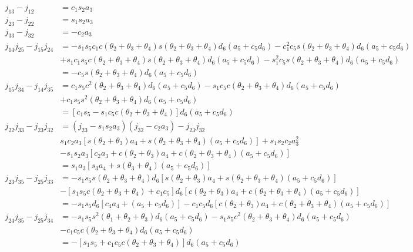 \begin{align*}
    j_{13} - j_{12} &= c_1s_2a_3 \\
    j_{23} - j_{22} &= s_1s_2a_3 \\
    j_{33} - j_{32} &= -c_2a_3 \\
    j_{14}j_{25} - j_{15}j_{24} &= -s_1s_5c_1c(\theta_2+\theta_3+\theta_4)s(\theta_2+\theta_3+\theta_4)d_6(a_5+c_5d_6) - c_1^2c_5s(\theta_2+\theta_3+\theta_4)d_6(a_5+c_5d_6) \\
                                &  +s_1c_1s_5c(\theta_2+\theta_3+\theta_4)s(\theta_2+\theta_3+\theta_4)d_6(a_5+c_5d_6) - s_1^2c_5s(\theta_2+\theta_3+\theta_4)d_6(a_5+c_5d_6) \\
                                &= -c_5s(\theta_2+\theta_3+\theta_4)d_6(a_5+c_5d_6)\\
    j_{15}j_{34} - j_{14}j_{35} &= c_1s_5c^2(\theta_2+\theta_3+\theta_4)d_6(a_5+c_5d_6) -s_1c_5c(\theta_2+\theta_3+\theta_4)d_6(a_5+c_5d_6) \\
                                &  +c_1s_5s^2(\theta_2+\theta_3+\theta_4)d_6(a_5+c_5d_6) \\
                                &= [c_1s_5-s_1c_5c(\theta_2+\theta_3+\theta_4)]d_6(a_5+c_5d_6) \\
    j_{22}j_{33} - j_{23}j_{32} &= (j_{23}-s_1s_2a_3)(j_{32}-c_2a_3) - j_{23}j_{32}\\
                                & s_1c_2a_3[s(\theta_2+\theta_3)a_4+s(\theta_2+\theta_3+\theta_4)(a_5+c_5d_6)]+s_1s_2c_2a_3^2\\
                                & -s_1s_2a_3[c_2a_3+c(\theta_2+\theta_3)a_4+c(\theta_2+\theta_3+\theta_4)(a_5+c_5d_6)]\\
                                &= s_1a_3[s_3a_4+s(\theta_3+\theta_4)(a_5+c_5d_6)]\\
    j_{23}j_{35} - j_{25}j_{33} &= -s_1s_5s(\theta_2+\theta_3+\theta_4)d_6[s(\theta_2+\theta_3)a_4 + s(\theta_2+\theta_3+\theta_4)(a_5+c_5d_6)] \\
                                &  -[s_1s_5c(\theta_2+\theta_3+\theta_4) + c_1c_5]d_6[c(\theta_2+\theta_3)a_4+c(\theta_2+\theta_3+\theta_4)(a_5+c_5d_6)] \\
                                &= -s_1s_5d_6[c_4a_4+(a_5+c_5d_6)] - c_1c_5d_6[c(\theta_2+\theta_3)a_4+c(\theta_2+\theta_3+\theta_4)(a_5+c_5d_6)]\\
    j_{24}j_{35} - j_{25}j_{34} &= -s_1s_5s^2(\theta_1+\theta_2+\theta_3)d_6(a_5+c_5d_6) - s_1s_5c^2(\theta_2+\theta_3+\theta_4)d_6(a_5+c_5d_6) \\
                                &  -c_1c_5c(\theta_2+\theta_3+\theta_4)d_6(a_5+c_5d_6) \\
                                &= -[s_1s_5+c_1c_5c(\theta_2+\theta_3+\theta_4)]d_6(a_5+c_5d_6) \\
\end{align*}

